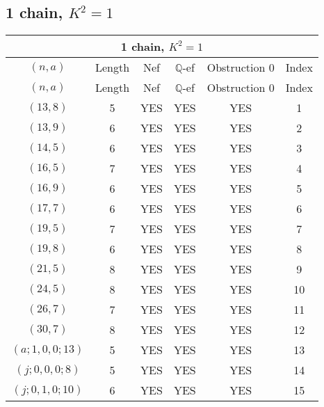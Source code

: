 \subsection{1 chain, $K^2 = 1$}
\begin{longtable}{|c|c|c|c|c|c|}
\hline
\multicolumn{6}{|c|}{1 chain, $K^2 = 1$}\\
\hline
$(n,a)$ & Length & Nef & $\mathbb Q$-ef & Obstruction 0 & Index\\
\hline
\endfirsthead

\hline
$(n,a)$ & Length & Nef & $\mathbb Q$-ef & Obstruction 0 & Index\\
\hline
\endhead
\hline
\endfoot

$(13, 8)$ & 5 & YES & YES & YES & 1\\
$(13, 9)$ & 6 & YES & YES & YES & 2\\
$(14, 5)$ & 6 & YES & YES & YES & 3\\
$(16, 5)$ & 7 & YES & YES & YES & 4\\
$(16, 9)$ & 6 & YES & YES & YES & 5\\
$(17, 7)$ & 6 & YES & YES & YES & 6\\
$(19, 5)$ & 7 & YES & YES & YES & 7\\
$(19, 8)$ & 6 & YES & YES & YES & 8\\
$(21, 5)$ & 8 & YES & YES & YES & 9\\
$(24, 5)$ & 8 & YES & YES & YES & 10\\
$(26, 7)$ & 7 & YES & YES & YES & 11\\
$(30, 7)$ & 8 & YES & YES & YES & 12\\
$(a; 1, 0, 0; 13)$ & 5 & YES & YES & YES & 13\\
$(j; 0, 0, 0; 8)$ & 5 & YES & YES & YES & 14\\
$(j; 0, 1, 0; 10)$ & 6 & YES & YES & YES & 15
\end{longtable}
